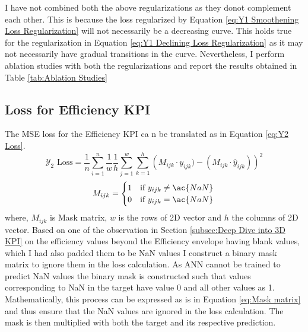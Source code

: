 \documentclass{report} %
\begin{document}
I have not combined both the above regularizations as they donot complement each other. This is because the loss regularized by Equation 
\ref{eq:Y1 Smoothening Loss Regularization} will not necessarily be a decreasing curve.
This holds true for the regularization in Equation \ref{eq:Y1 Declining Loss Regularization} as it may not necessarily have gradual transitions in the curve.
Nevertheless, I perform ablation studies with both the regularizations and report the results obtained in Table \ref{tab:Ablation Studies}

\subsection{Loss for Efficiency KPI}\label{sec:Loss for 3D KPI}

The \ac{MSE} loss for the Efficiency \ac{KPI} ca n be translated as in Equation \ref{eq:Y2 Loss}.
\begin{equation}
\text{$\mathcal{Y}_2$ Loss} = \frac{1}{n} \sum_{i=1}^{n} \frac{1}{w} \frac{1}{h} \sum_{j=1}^{w} \sum_{k=1}^{h} \left( M_{ijk} \cdot y_{ijk}) - (M_{ijk} \cdot \hat{y}_{ijk})\right)^2
\label{eq:Y2 Loss}
\end{equation}
\begin{equation}
    M_{ijk} = \begin{cases}
        1 & \text{if } y_{ijk} \neq \ac{NaN} \\
        0 & \text{if } y_{ijk} = \ac{NaN} 
        \end{cases} \\
\label{eq:Mask matrix}
\end{equation}
where, \(M_{ijk}\) is Mask matrix, \(w\) is the rows of 2\ac{D} vector and \(h\) the columns of 2\ac{D} vector.
Based on one of the observation in Section \ref{subsec:Deep Dive into 3D KPI} on the efficiency values beyond the Efficiency envelope having blank values, 
which I had also padded them to be \ac{NaN} values I construct a binary mask matrix to ignore them in the loss calculation.
As \ac{ANN} cannot be trained to predict \ac{NaN} values the binary mask is constructed such that values corresponding to \ac{NaN} in the target have value 0 and all other values as 1.
Mathematically, this process can be expressed as is in Equation \ref{eq:Mask matrix} and thus ensure that the \ac{NaN} values are ignored in the loss calculation. 
The mask is then multiplied with both the target and its respective prediction. 
\end{document}
